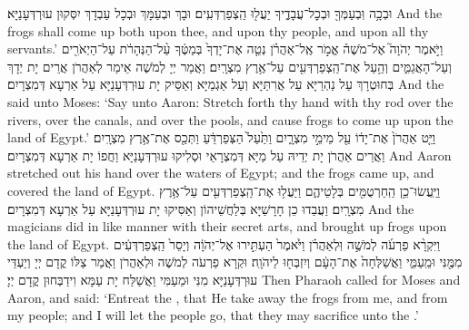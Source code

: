 {וּבְכָ֥ה וּֽבְעַמְּךָ֖ וּבְכׇל־עֲבָדֶ֑יךָ יַעֲל֖וּ הַֽצְפַרְדְּעִֽים׃
}
{וּבָךְ וּבְעַמָּךְ וּבְכָל עַבְדָךְ יִסְּקוּן עוּרְדְּעָנַיָּא׃}
{And the frogs shall come up both upon thee, and upon thy people, and upon all thy servants.’}{}
\newperek
{}%
{וַיֹּ֣אמֶר יְהֹוָה֮ אֶל־מֹשֶׁה֒ אֱמֹ֣ר אֶֽל־אַהֲרֹ֗ן נְטֵ֤ה אֶת־יָדְךָ֙ בְּמַטֶּ֔ךָ עַ֨ל־הַנְּהָרֹ֔ת עַל־הַיְאֹרִ֖ים וְעַל־הָאֲגַמִּ֑ים וְהַ֥עַל אֶת־הַֽצְפַרְדְּעִ֖ים עַל־אֶ֥רֶץ מִצְרָֽיִם׃}
{וַאֲמַר יְיָ לְמֹשֶׁה אֵימַר לְאַהֲרֹן אֲרֵים יָת יְדָךְ בְּחוּטְרָךְ עַל נַהְרַיָּא עַל אֲרִתַּיָּא וְעַל אַגְמַיָּא וְאַסֵּיק יָת עוּרְדְּעָנַיָּא עַל אַרְעָא דְּמִצְרָיִם׃}
{And the \lord\space said unto Moses: ‘Say unto Aaron: Stretch forth thy hand with thy rod over the rivers, over the canals, and over the pools, and cause frogs to come up upon the land of Egypt.’}{}
{וַיֵּ֤ט אַהֲרֹן֙ אֶת־יָד֔וֹ עַ֖ל מֵימֵ֣י מִצְרָ֑יִם וַתַּ֙עַל֙ הַצְּפַרְדֵּ֔עַ וַתְּכַ֖ס אֶת־אֶ֥רֶץ מִצְרָֽיִם׃
}
{וַאֲרֵים אַהֲרֹן יָת יְדֵיהּ עַל מַיָּא דְּמִצְרָאֵי וּסְלִיקוּ עוּרְדְּעָנַיָּא וַחֲפוֹ יָת אַרְעָא דְּמִצְרָיִם׃}
{And Aaron stretched out his hand over the waters of Egypt; and the frogs came up, and covered the land of Egypt.}{}
{וַיַּֽעֲשׂוּ־כֵ֥ן הַֽחַרְטֻמִּ֖ים בְּלָטֵיהֶ֑ם וַיַּעֲל֥וּ אֶת־הַֽצְפַרְדְּעִ֖ים עַל־אֶ֥רֶץ מִצְרָֽיִם׃}
{וַעֲבַדוּ כֵן חָרָשַׁיָּא בְּלַחֲשֵׁיהוֹן וְאַסִּיקוּ יָת עוּרְדְּעָנַיָּא עַל אַרְעָא דְּמִצְרָיִם׃}
{And the magicians did in like manner with their secret arts, and brought up frogs upon the land of Egypt.}{}
{וַיִּקְרָ֨א פַרְעֹ֜ה לְמֹשֶׁ֣ה וּֽלְאַהֲרֹ֗ן וַיֹּ֙אמֶר֙ הַעְתִּ֣ירוּ אֶל־יְהֹוָ֔ה וְיָסֵר֙ הַֽצְפַרְדְּעִ֔ים מִמֶּ֖נִּי וּמֵֽעַמִּ֑י וַאֲשַׁלְּחָה֙ אֶת־הָעָ֔ם וְיִזְבְּח֖וּ לַיהֹוָֽה׃}
{וּקְרָא פַרְעֹה לְמֹשֶׁה וּלְאַהֲרֹן וַאֲמַר צַלּוֹ קֳדָם יְיָ וְיַעְדֵּי עוּרְדְּעָנַיָּא מִנִּי וּמֵעַמִּי וַאֲשַׁלַּח יָת עַמָּא וִידַבְּחוּן קֳדָם יְיָ׃}
{Then Pharaoh called for Moses and Aaron, and said: ‘Entreat the \lord, that He take away the frogs from me, and from my people; and I will let the people go, that they may sacrifice unto the \lord.’}{}
